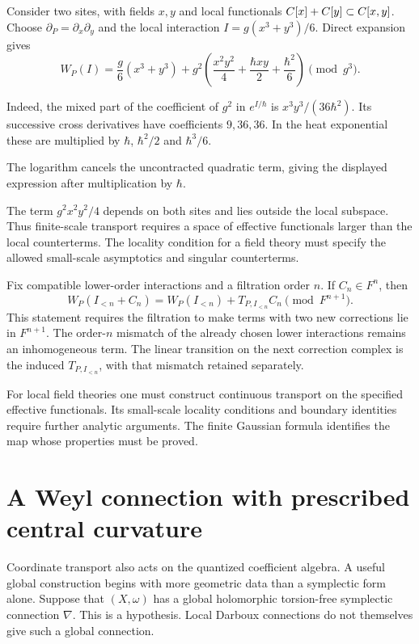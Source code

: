 \begin{example}
\label{mht:ex:rg-nonlocal}
Consider two sites, with fields $x,y$ and local functionals
$C[x]+C[y]\subset C[x,y]$. Choose
$\partial_P=\partial_x\partial_y$ and the local interaction
$I=g(x^3+y^3)/6$. Direct expansion gives
\[
 W_P(I)=\frac g6(x^3+y^3)
   +g^2\left(\frac{x^2y^2}{4}
             +\frac{\hbar xy}{2}+\frac{\hbar^2}{6}\right)
   \pmod{g^3}.
\]

Indeed, the mixed part of the coefficient of $g^2$ in
$e^{I/\hbar}$ is $x^3y^3/(36\hbar^2)$. Its successive cross
derivatives have coefficients $9,36,36$. In the heat exponential
these are multiplied by $\hbar$, $\hbar^2/2$ and $\hbar^3/6$.

The logarithm cancels the uncontracted quadratic term, giving the
displayed expression after multiplication by $\hbar$.

The term $g^2x^2y^2/4$ depends on both sites and lies outside the
local subspace. Thus finite-scale transport requires a space of
effective functionals larger than the local counterterms. The
locality condition for a field theory must specify the allowed
small-scale asymptotics and singular counterterms.
\end{example}

Fix compatible lower-order interactions and a filtration order
$n$. If $C_n\in F^n$, then
\[
 W_P(I_{<n}+C_n)
 =W_P(I_{<n})+T_{P,I_{<n}}C_n\pmod{F^{n+1}}.
\]
This statement requires the filtration to make terms with two new
corrections lie in $F^{n+1}$. The order-$n$ mismatch of the already
chosen lower interactions remains an inhomogeneous term. The
linear transition on the next correction complex is the induced
$T_{P,I_{<n}}$, with that mismatch retained separately.

For local field theories one must construct continuous transport
on the specified effective functionals. Its small-scale locality
conditions and boundary identities require further analytic
arguments. The finite Gaussian formula identifies the map whose
properties must be proved.

\section{A Weyl connection with prescribed central curvature}

Coordinate transport also acts on the quantized coefficient
algebra. A useful global construction begins with more geometric
data than a symplectic form alone. Suppose that $(X,\omega)$ has a
global holomorphic torsion-free symplectic connection $\nabla$.
This is a hypothesis. Local Darboux connections do not themselves
give such a global connection.

